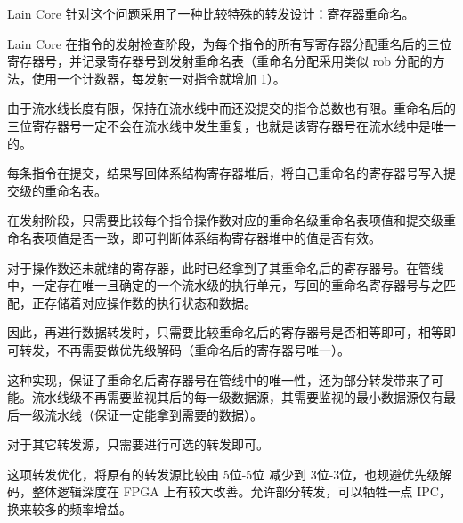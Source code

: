 Lain Core 针对这个问题采用了一种比较特殊的转发设计：寄存器重命名。

Lain Core 在指令的发射检查阶段，为每个指令的所有写寄存器分配重名后的三位寄存器号，并记录寄存器号到发射重命名表（重命名分配采用类似 rob 分配的方法，使用一个计数器，每发射一对指令就增加 1）。

由于流水线长度有限，保持在流水线中而还没提交的指令总数也有限。重命名后的三位寄存器号一定不会在流水线中发生重复，也就是该寄存器号在流水线中是唯一的。

每条指令在提交，结果写回体系结构寄存器堆后，将自己重命名的寄存器号写入提交级的重命名表。

在发射阶段，只需要比较每个指令操作数对应的重命名级重命名表项值和提交级重命名表项值是否一致，即可判断体系结构寄存器堆中的值是否有效。

对于操作数还未就绪的寄存器，此时已经拿到了其重命名后的寄存器号。在管线中，一定存在唯一且确定的一个流水级的执行单元，写回的重命名寄存器号与之匹配，正存储着对应操作数的执行状态和数据。

因此，再进行数据转发时，只需要比较重命名后的寄存器号是否相等即可，相等即可转发，不再需要做优先级解码（重命名后的寄存器号唯一）。

这种实现，保证了重命名后寄存器号在管线中的唯一性，还为部分转发带来了可能。流水线级不再需要监视其后的每一级数据源，其需要监视的最小数据源仅有最后一级流水线（保证一定能拿到需要的数据）。

对于其它转发源，只需要进行可选的转发即可。

这项转发优化，将原有的转发源比较由 5位-5位 减少到 3位-3位，也规避优先级解码，整体逻辑深度在 FPGA 上有较大改善。允许部分转发，可以牺牲一点 IPC，换来较多的频率增益。
